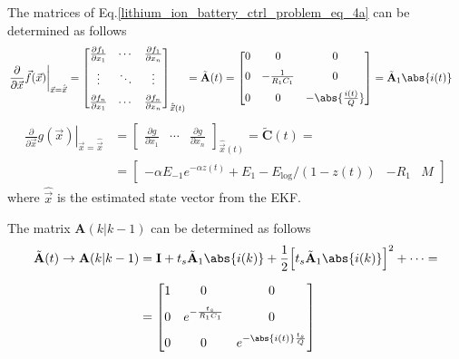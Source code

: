 \documentclass[12pt,a4paper,oneside]{book}
\begin{document}
\begin{onehalfspace}
\vspace{5mm}
The matrices of Eq.\eqref{lithium_ion_battery_ctrl_problem_eq_4a} can be determined as follows 
\begin{equation}\label{lithium_ion_battery_ctrl_problem_eq_6}
	\begin{aligned}
		\left.\frac{\partial}{\partial 
			\vec{x}}\vec{f}(\vec{x})\right|_{\vec{x}=\hat{\vec{x}}} &= 
		\begin{bmatrix} \frac{\partial f_1}{\partial x_1} & \cdots & 
			\frac{\partial f_1}{\partial x_n} \\[6pt]
			\vdots & \ddots & \vdots \\[6pt]
			\frac{\partial f_n}{\partial x_1} & \cdots & \frac{\partial 
				f_n}{\partial x_n}
		\end{bmatrix}_{\hat{\vec{x}}(t)} = \tilde{\mathbf{A}}(t) = \begin{bmatrix}
			0&0&0 \\[6pt] 0&-\frac{1}{R_1C_1}&0 \\[6pt] 0&0&-\abs{\frac{i(t)}{Q}}
		\end{bmatrix} = \tilde{\mathbf{A}}_1\abs{i(t)}
	\end{aligned}
\end{equation} 
\begin{equation}\label{lithium_ion_battery_ctrl_problem_eq_7}
	\begin{aligned}
		\left.\frac{\partial}{\partial 
			\vec{x}}{g}(\vec{x})\right|_{\vec{x}=\hat{\vec{x}}} &= 
		\begin{bmatrix} \frac{\partial g}{\partial x_1} & \cdots & 
			\frac{\partial g}{\partial x_n}
		\end{bmatrix}_{\hat{\vec{x}}(t)} = \tilde{\mathbf{C}}(t) =  \\[6pt]
		&=\begin{bmatrix}
			-\alpha E_{-1}e^{-\alpha z(t)}+E_1-E_\text{log}/(1-z(t)) & -R_1 & M
		\end{bmatrix}
	\end{aligned}
\end{equation} 
where $\hat{\vec{x}}$ is the estimated state vector from the EKF. 

\vspace{5mm}
The matrix $\mathbf{A}(k|k-1)$ can be determined as follows
\begin{equation}
	\begin{aligned}
		\tilde{\mathbf{A}}(t) \rightarrow \mathbf{A}(k|k-1) &= 
		\mathbf{I}+t_s\tilde{\mathbf{A}}_1\abs{i(k)}+
		\frac{1}{2}\Big[t_s\tilde{\mathbf{A}}_1\abs{i(k)}\Big]^2+\cdots 
		=\\[6pt] 
		&= \begin{bmatrix} 	1&0&0 \\[6pt] 0&e^{-\frac{t_s}{R_1C_1}}&0 \\[6pt] 0&0&e^{-\abs{i(t)}\frac{t_s}{Q}}\end{bmatrix}
	\end{aligned}
\end{equation}


\end{onehalfspace}
\end{document}
